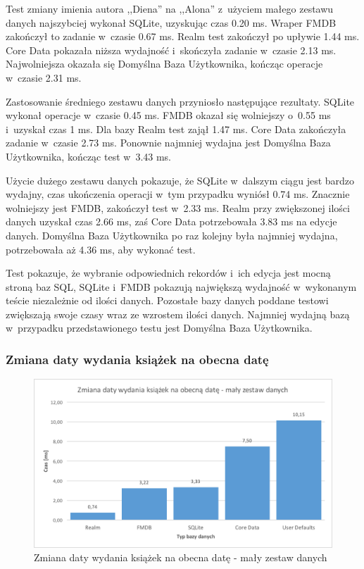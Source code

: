Test zmiany imienia autora ,,Diena'' na ,,Alona'' z~użyciem małego zestawu danych najszybciej wykonał SQLite, uzyskując czas 0.20 ms. Wraper FMDB zakończył to zadanie w~czasie 0.67 ms. Realm test zakończył po upływie 1.44 ms. Core Data pokazała niższa wydajność i~skończyła zadanie w~czasie 2.13 ms. Najwolniejsza okazała się Domyślna Baza Użytkownika, kończąc operacje w~czasie 2.31 ms. 

Zastosowanie średniego zestawu danych przyniosło następujące rezultaty. SQLite wykonał operacje w~czasie 0.45 ms. FMDB okazał się wolniejszy o~0.55 ms i~uzyskał czas 1 ms. Dla bazy Realm test zajął 1.47 ms. Core Data zakończyła zadanie w~czasie 2.73 ms. Ponownie najmniej wydajna jest Domyślna Baza Użytkownika, kończąc test w~3.43 ms.

Użycie dużego zestawu danych pokazuje, że SQLite w~dalszym ciągu jest bardzo wydajny, czas ukończenia operacji w~tym przypadku wyniósł 0.74 ms. Znacznie wolniejszy jest FMDB, zakończył test w~2.33 ms. Realm przy zwiększonej ilości danych uzyskał czas 2.66 ms, zaś Core Data potrzebowała 3.83 ms na edycje danych. Domyślna Baza Użytkownika po raz kolejny była najmniej wydajna, potrzebowała aż 4.36 ms, aby wykonać test. 

Test pokazuje, że wybranie odpowiednich rekordów i~ich edycja jest mocną stroną baz SQL, SQLite i~FMDB pokazują największą wydajność w~wykonanym teście niezależnie od ilości danych. Pozostałe bazy danych poddane testowi zwiększają swoje czasy wraz ze wzrostem ilości danych. Najmniej wydajną bazą w~przypadku przedstawionego testu jest Domyślna Baza Użytkownika. 

\subsubsection{Zmiana daty wydania książek na obecna datę}

\begin{figure}[H]
    \centering\includegraphics[width=\linewidth]{img/update_data/update_book/update_book_small_test.png}
    \caption{Zmiana daty wydania książek na obecna datę - mały zestaw danych}
    \label{img: update-by-book-small}
\end{figure}

